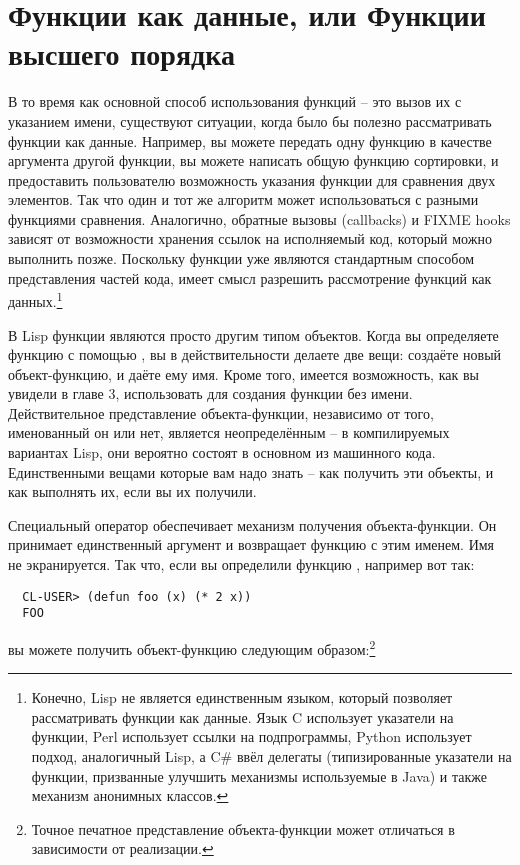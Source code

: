 \section{Функции как данные, или Функции высшего порядка}

В то время как основной способ использования функций -- это вызов их с указанием имени,
существуют ситуации, когда было бы полезно рассматривать функции как данные.  Например, вы
можете передать одну функцию в качестве аргумента другой функции, вы можете написать общую
функцию сортировки, и предоставить пользователю возможность указания функции для сравнения
двух элементов.  Так что один и тот же алгоритм может использоваться с разными функциями
сравнения.  Аналогично, обратные вызовы (callbacks) и FIXME hooks зависят от возможности
хранения ссылок на исполняемый код, который можно выполнить позже.  Поскольку функции уже
являются стандартным способом представления частей кода, имеет смысл разрешить
рассмотрение функций как данных.\footnote{Конечно, Lisp не является единственным языком,
  который позволяет рассматривать функции как данные.  Язык C использует указатели на
  функции, Perl использует ссылки на подпрограммы, Python использует подход, аналогичный
  Lisp, а C\# ввёл делегаты (типизированные указатели на функции, призванные улучшить
  механизмы используемые в Java) и также механизм анонимных классов.}

В Lisp функции являются просто другим типом объектов.  Когда вы определяете функцию с
помощью , вы в действительности делаете две вещи: создаёте новый
объект-функцию, и даёте ему имя.  Кроме того, имеется возможность, как вы увидели в главе
3, использовать  для создания функции без имени.  Действительное
представление объекта-функции, независимо от того, именованный он или нет, является
неопределённым -- в компилируемых вариантах Lisp, они вероятно состоят в основном из
машинного кода.  Единственными вещами которые вам надо знать -- как получить эти объекты,
и как выполнять их, если вы их получили.

Специальный оператор  обеспечивает механизм получения объекта-функции.  Он
принимает единственный аргумент и возвращает функцию с этим именем.  Имя не экранируется.
Так что, если вы определили функцию , например вот так:

\begin{verbatim}
  CL-USER> (defun foo (x) (* 2 x))
  FOO
\end{verbatim}

вы можете получить объект-функцию следующим образом:\footnote{Точное печатное
  представление объекта-функции может отличаться в зависимости от реализации.}

